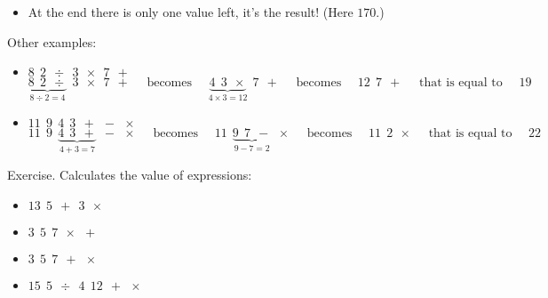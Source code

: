 \documentclass[11pt,class=report,crop=false]{standalone}
\begin{document}
\begin{cours}
\begin{itemize}
  \item At the end there is only one value left, it's the result! (Here $170$.)
\end{itemize}

\bigskip

Other examples:
\begin{itemize}
  \item $8 \ \ 2 \ \ \div \ \ 3 \ \ \times \ \ 7 \ \ +$  
$$\underbrace{8 \ \ 2 \ \ \div}_{8 \div 2 = 4} \ \ 3 \ \ \times \ \ 7 \ \ +
\quad\text{ becomes }\quad
\underbrace{4 \ \ 3 \ \ \times}_{4 \times 3 = 12} \ \ 7 \ \ + 
\quad\text{ becomes }\quad
 12 \ \ 7 \ \ +
\quad\text{ that is equal to }\quad
19$$ 
 
  \item $11 \ \ 9 \ \ 4 \ \ 3 \ \ + \ \ - \ \ \times$  
$$11 \ \ 9 \ \ \underbrace{4 \ \ 3 \ \ +}_{4+3=7} \ \ - \ \ \times
\quad\text{ becomes }\quad
11 \ \ \underbrace{9 \ \ 7 \ \ -}_{9 - 7 = 2} \ \ \times 
\quad\text{ becomes }\quad
11 \ \ 2 \ \ \times
\quad\text{ that is equal to }\quad
22$$ 
\end{itemize}  

Exercise. Calculates the value of expressions:
\begin{itemize}
  \item $13 \ \ 5 \ \ + \ \ 3 \ \ \times$
  \item $3 \ \ 5 \ \ 7 \ \ \times \ \ +$
  \item $3 \ \ 5 \ \ 7 \ \ + \ \ \times$  
  \item $15 \ \ 5 \ \ \div \ \ 4 \ \ 12 \ \ + \ \ \times$
\end{itemize}

\end{cours}

\end{document}

